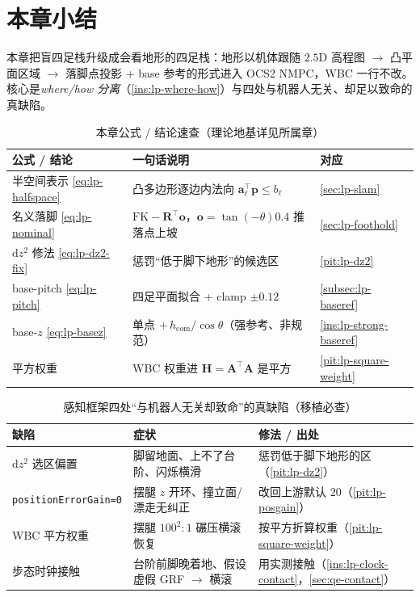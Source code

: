 \section*{本章小结}
\label{sec:lp-summary}

本章把盲四足栈升级成会看地形的四足栈：地形以机体跟随 $2.5$D 高程图 $\to$ 凸平面区域 $\to$ 落脚点投影 + base 参考的形式进入 OCS2 NMPC，WBC 一行不改。核心是\emph{where/how 分离}（\cref{ins:lp-where-how}）与四处与机器人无关、却足以致命的真缺陷。

\begin{table}[H]\centering\small
\caption{本章公式 / 结论速查（理论地基详见所属章）}
\begin{tabular}{lll}
\toprule
公式 / 结论 & 一句话说明 & 对应 \\
\midrule
半空间表示 \cref{eq:lp-halfspace} & 凸多边形逐边内法向 $\mathbf{a}_\ell^\top\mathbf{p}\le b_\ell$ & \cref{sec:lp-slam} \\
名义落脚 \cref{eq:lp-nominal} & $\mathrm{FK}-\mathbf{R}^\top\mathbf{o}$，$\mathbf{o}=\tan(-\theta)0.4$ 推落点上坡 & \cref{sec:lp-foothold} \\
$\mathrm{d}z^2$ 修法 \cref{eq:lp-dz2-fix} & 惩罚“低于脚下地形”的候选区 & \cref{pit:lp-dz2} \\
base-pitch \cref{eq:lp-pitch} & 四足平面拟合 + clamp $\pm 0.12$ & \cref{subsec:lp-baseref} \\
base-$z$ \cref{eq:lp-basez} & 单点 $+\,h_{\mathrm{com}}/\cos\theta$（强参考、非规范）& \cref{ins:lp-strong-baseref} \\
平方权重 & WBC 权重进 $\mathbf{H}=\mathbf{A}^\top\mathbf{A}$ 是平方 & \cref{pit:lp-square-weight} \\
\bottomrule
\end{tabular}
\end{table}

\begin{table}[H]\centering\small
\caption{感知框架四处“与机器人无关却致命”的真缺陷（移植必查）}
\begin{tabular}{p{} p{} p{}}
\toprule
缺陷 & 症状 & 修法 / 出处 \\
\midrule
$\mathrm{d}z^2$ 选区偏置 & 脚留地面、上不了台阶、闪烁横滑 & 惩罚低于脚下地形的区（\cref{pit:lp-dz2}）\\
\texttt{positionErrorGain=0} & 摆腿 $z$ 开环、撞立面/漂走无纠正 & 改回上游默认 $20$（\cref{pit:lp-posgain}）\\
WBC 平方权重 & 摆腿 $100^2{:}1$ 碾压横滚恢复 & 按平方折算权重（\cref{pit:lp-square-weight}）\\
步态时钟接触 & 台阶前脚晚着地、假设虚假 GRF $\to$ 横滚 & 用实测接触（\cref{ins:lp-clock-contact}，\cref{sec:qe-contact}）\\
\bottomrule
\end{tabular}
\end{table}

